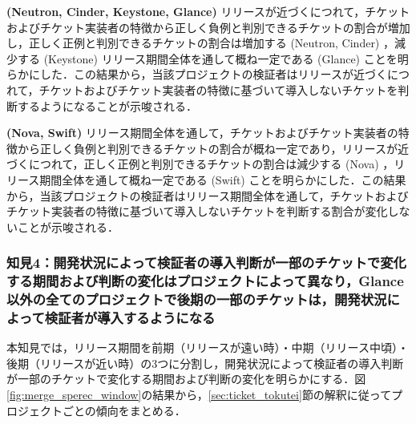 \documentclass[11pt]{jreport}
\begin{document}
\textbf{ (Neutron, Cinder, Keystone, Glance) }リリースが近づくにつれて，チケットおよびチケット実装者の特徴から正しく負例と判別できるチケットの割合が増加し，正しく正例と判別できるチケットの割合は増加する (Neutron, Cinder) ，減少する (Keystone) リリース期間全体を通して概ね一定である (Glance) ことを明らかにした．この結果から，当該プロジェクトの検証者はリリースが近づくにつれて，チケットおよびチケット実装者の特徴に基づいて導入しないチケットを判断するようになることが示唆される．

\textbf{ (Nova, Swift) }リリース期間全体を通して，チケットおよびチケット実装者の特徴から正しく負例と判別できるチケットの割合が概ね一定であり，リリースが近づくにつれて，正しく正例と判別できるチケットの割合は減少する (Nova) ，リリース期間全体を通して概ね一定である (Swift) ことを明らかにした．この結果から，当該プロジェクトの検証者はリリース期間全体を通して，チケットおよびチケット実装者の特徴に基づいて導入しないチケットを判断する割合が変化しないことが示唆される．

\begin{table}[t]
\caption{各プロジェクトの導入予測モデルにおける再現率（再掲），特異度の回帰係数の分類}
\label{table:merge_spec_jikeiretsu}
\centering
\vspace{0.5zh}
\end{table}


\subsubsection{知見4：開発状況によって検証者の導入判断が一部のチケットで変化する期間および判断の変化はプロジェクトによって異なり，Glance以外の全てのプロジェクトで後期の一部のチケットは，開発状況によって検証者が導入するようになる}
本知見では，リリース期間を前期（リリースが遠い時）・中期（リリース中頃）・後期（リリースが近い時）の3つに分割し，開発状況によって検証者の導入判断が一部のチケットで変化する期間および判断の変化を明らかにする．図\ref{fig:merge_sperec_window}の結果から，\ref{sec:ticket_tokutei}節の解釈に従ってプロジェクトごとの傾向をまとめる．
\end{document}
